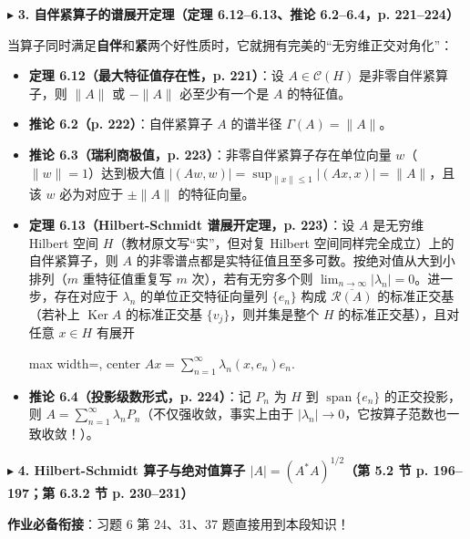\documentclass[11pt,a4paper]{article}
\providecommand{\tightlist}{\setlength{\itemsep}{2pt}\setlength{\parskip}{0pt}}
\newcommand{\SubSubHeading}[1]{%
  \Needspace{6.5\baselineskip}\vspace{5.5pt}\noindent
  \textcolor{AccentMain}{\scriptsize$\blacktriangleright$}\hspace{4pt}%
  {\small\bfseries\color{AccentMain}#1}\par\nopagebreak[4]\vspace{2.5pt}%
}
\renewenvironment{quote}{%
  \begin{tcolorbox}[
    enhanced,
    breakable,
    colback=AccentSoft!48!white,
    colframe=AccentMain,
    boxrule=0pt,
    leftrule=2.8pt,
    arc=2.5pt,
    left=9pt, right=8pt, top=6pt, bottom=6pt,
    before skip=5.5pt, after skip=5.5pt
  ]\small
}{%
  \end{tcolorbox}%
}
\newcommand{\FitDisplayMath}[1]{%
  \par\vspace{4.5pt}\noindent
  \begin{adjustbox}{max width=\linewidth, center}
    $\displaystyle #1$
  \end{adjustbox}
  \par\vspace{4.5pt}%
}
\begin{document}
\SubSubHeading{3. 自伴紧算子的谱展开定理（定理 6.12--6.13、推论 6.2--6.4，p. 221--224）}

当算子同时满足\textbf{自伴}和\textbf{紧}两个好性质时，它就拥有完美的``无穷维正交对角化''：

\begin{itemize}
\tightlist
\item
  \textbf{定理 6.12（最大特征值存在性，p. 221）}：设 \(A \in \mathcal{C}(H)\) 是非零自伴紧算子，则 \(\|A\|\) 或 \(-\|A\|\) 必至少有一个是 \(A\) 的特征值。
\item
  \textbf{推论 6.2（p. 222）}：自伴紧算子 \(A\) 的谱半径 \(\Gamma(A) = \|A\|\)。
\item
  \textbf{推论 6.3（瑞利商极值，p. 223）}：非零自伴紧算子存在单位向量 \(w\)（\(\|w\|=1\)）达到极大值 \(|(Aw, w)| = \sup_{\|x\|\le 1}|(Ax, x)| = \|A\|\)，且该 \(w\) 必为对应于 \(\pm\|A\|\) 的特征向量。
\item
  \textbf{定理 6.13（Hilbert-Schmidt 谱展开定理，p. 223）}：设 \(A\) 是无穷维 Hilbert 空间 \(H\)（教材原文写``实''，但对复 Hilbert 空间同样完全成立）上的自伴紧算子，则 \(A\) 的非零谱点都是实特征值且至多可数。按绝对值从大到小排列（\(m\) 重特征值重复写 \(m\) 次），若有无穷多个则 \(\lim_{n\to\infty} |\lambda_n| = 0\)。进一步，存在对应于 \(\lambda_n\) 的单位正交特征向量列 \(\{e_n\}\) 构成 \(\overline{\mathcal{R}(A)}\) 的标准正交基（若补上 \(\operatorname{Ker} A\) 的标准正交基 \(\{v_j\}\)，则并集是整个 \(H\) 的标准正交基），且对任意 \(x \in H\) 有展开 
\FitDisplayMath{Ax = \sum_{n=1}^{\infty} \lambda_n (x, e_n) e_n.}

\item
  \textbf{推论 6.4（投影级数形式，p. 224）}：记 \(P_n\) 为 \(H\) 到 \(\operatorname{span}\{e_n\}\) 的正交投影，则 \(A = \sum_{n=1}^\infty \lambda_n P_n\)（不仅强收敛，事实上由于 \(|\lambda_n| \to 0\)，它按算子范数也一致收敛！）。
\end{itemize}

\SubSubHeading{4. Hilbert-Schmidt 算子与绝对值算子 \(|A| = (A^*A)^{1/2}\)（第 5.2 节 p. 196--197；第 6.3.2 节 p. 230--231）}

\begin{quote}
\textbf{作业必备衔接}：习题 6 第 24、31、37 题直接用到本段知识！
\end{quote}
\end{document}
